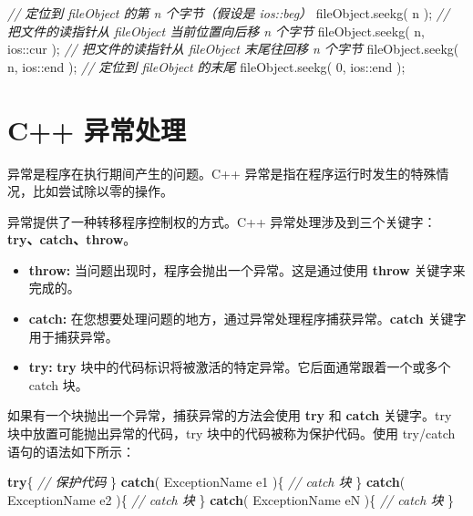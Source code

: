 \documentclass[
]{article}
\newenvironment{Shaded}{}{}
\newcommand{\CommentTok}[1]{\textcolor[rgb]{0.38,0.63,0.69}{\textit{#1}}}
\newcommand{\ControlFlowTok}[1]{\textcolor[rgb]{0.00,0.44,0.13}{\textbf{#1}}}
\newcommand{\DecValTok}[1]{\textcolor[rgb]{0.25,0.63,0.44}{#1}}
\newcommand{\NormalTok}[1]{#1}
\newcommand{\OperatorTok}[1]{\textcolor[rgb]{0.40,0.40,0.40}{#1}}
\providecommand{\tightlist}{%
  \setlength{\itemsep}{0pt}\setlength{\parskip}{0pt}}
\begin{document}
\begin{Shaded}
\begin{Highlighting}[]
\CommentTok{// 定位到 fileObject 的第 n 个字节（假设是 ios::beg）}
\NormalTok{fileObject}\OperatorTok{.}\NormalTok{seekg}\OperatorTok{(}\NormalTok{ n }\OperatorTok{);}
\CommentTok{// 把文件的读指针从 fileObject 当前位置向后移 n 个字节}
\NormalTok{fileObject}\OperatorTok{.}\NormalTok{seekg}\OperatorTok{(}\NormalTok{ n}\OperatorTok{,}\NormalTok{ ios}\OperatorTok{::}\NormalTok{cur }\OperatorTok{);}
\CommentTok{// 把文件的读指针从 fileObject 末尾往回移 n 个字节}
\NormalTok{fileObject}\OperatorTok{.}\NormalTok{seekg}\OperatorTok{(}\NormalTok{ n}\OperatorTok{,}\NormalTok{ ios}\OperatorTok{::}\NormalTok{end }\OperatorTok{);}
\CommentTok{// 定位到 fileObject 的末尾}
\NormalTok{fileObject}\OperatorTok{.}\NormalTok{seekg}\OperatorTok{(} \DecValTok{0}\OperatorTok{,}\NormalTok{ ios}\OperatorTok{::}\NormalTok{end }\OperatorTok{);}
\end{Highlighting}
\end{Shaded}

\hypertarget{c-ux5f02ux5e38ux5904ux7406}{%
\section{C++ 异常处理}\label{c-ux5f02ux5e38ux5904ux7406}}

异常是程序在执行期间产生的问题。C++
异常是指在程序运行时发生的特殊情况，比如尝试除以零的操作。

异常提供了一种转移程序控制权的方式。C++
异常处理涉及到三个关键字：\textbf{try、catch、throw}。

\begin{itemize}
\tightlist
\item
  \textbf{throw:} 当问题出现时，程序会抛出一个异常。这是通过使用
  \textbf{throw} 关键字来完成的。
\item
  \textbf{catch:}
  在您想要处理问题的地方，通过异常处理程序捕获异常。\textbf{catch}
  关键字用于捕获异常。
\item
  \textbf{try:} \textbf{try}
  块中的代码标识将被激活的特定异常。它后面通常跟着一个或多个 catch 块。
\end{itemize}

如果有一个块抛出一个异常，捕获异常的方法会使用 \textbf{try} 和
\textbf{catch} 关键字。try 块中放置可能抛出异常的代码，try
块中的代码被称为保护代码。使用 try/catch 语句的语法如下所示：

\begin{Shaded}
\begin{Highlighting}[]
\ControlFlowTok{try}\OperatorTok{\{}
   \CommentTok{// 保护代码}
\OperatorTok{\}}
\ControlFlowTok{catch}\OperatorTok{(}\NormalTok{ ExceptionName e1 }\OperatorTok{)\{}
   \CommentTok{// catch 块}
\OperatorTok{\}}
\ControlFlowTok{catch}\OperatorTok{(}\NormalTok{ ExceptionName e2 }\OperatorTok{)\{}
   \CommentTok{// catch 块}
\OperatorTok{\}}
\ControlFlowTok{catch}\OperatorTok{(}\NormalTok{ ExceptionName eN }\OperatorTok{)\{}
   \CommentTok{// catch 块}
\OperatorTok{\}}
\end{Highlighting}
\end{Shaded}
\end{document}
